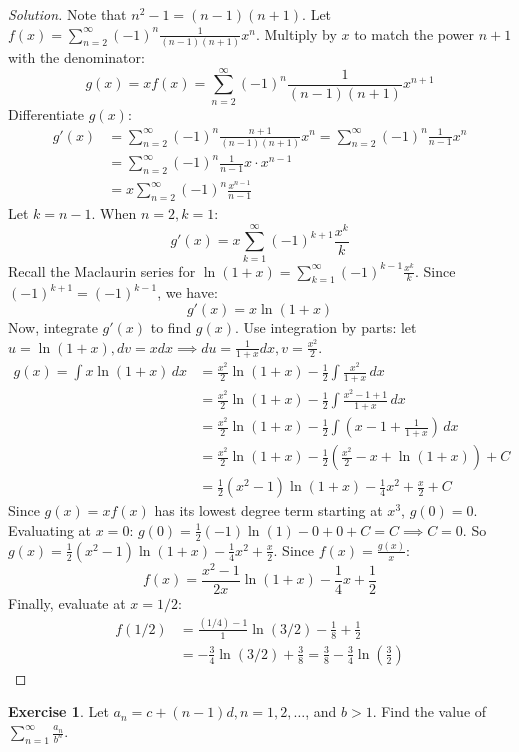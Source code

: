 \documentclass[11pt]{article}
\theoremstyle{definition}
\newtheorem{exercise}{Exercise}[section]
\newenvironment{solution}{\begin{proof}[Solution]}{\end{proof}}
\begin{document}
\begin{solution}
Note that $n^2 - 1 = (n-1)(n+1)$.
Let $f(x) = \sum_{n=2}^{\infty} (-1)^n \frac{1}{(n-1)(n+1)} x^n$.
Multiply by $x$ to match the power $n+1$ with the denominator:
\[
g(x) = xf(x) = \sum_{n=2}^{\infty} (-1)^n \frac{1}{(n-1)(n+1)} x^{n+1}
\]
Differentiate $g(x)$:
\begin{align*}
g'(x) &= \sum_{n=2}^{\infty} (-1)^n \frac{n+1}{(n-1)(n+1)} x^n = \sum_{n=2}^{\infty} (-1)^n \frac{1}{n-1} x^n \\
&= \sum_{n=2}^{\infty} (-1)^n \frac{1}{n-1} x \cdot x^{n-1} \\
&= x \sum_{n=2}^{\infty} (-1)^n \frac{x^{n-1}}{n-1}
\end{align*}
Let $k = n-1$. When $n=2, k=1$:
\[
g'(x) = x \sum_{k=1}^{\infty} (-1)^{k+1} \frac{x^k}{k}
\]
Recall the Maclaurin series for $\ln(1+x) = \sum_{k=1}^{\infty} (-1)^{k-1} \frac{x^k}{k}$. Since $(-1)^{k+1} = (-1)^{k-1}$, we have:
\[
g'(x) = x \ln(1+x)
\]
Now, integrate $g'(x)$ to find $g(x)$. Use integration by parts: let $u = \ln(1+x), dv = x dx \implies du = \frac{1}{1+x}dx, v = \frac{x^2}{2}$.
\begin{align*}
g(x) = \int x \ln(1+x) \,dx &= \frac{x^2}{2}\ln(1+x) - \frac{1}{2} \int \frac{x^2}{1+x} \,dx \\
&= \frac{x^2}{2}\ln(1+x) - \frac{1}{2} \int \frac{x^2 - 1 + 1}{1+x} \,dx \\
&= \frac{x^2}{2}\ln(1+x) - \frac{1}{2} \int \left( x - 1 + \frac{1}{1+x} \right) \,dx \\
&= \frac{x^2}{2}\ln(1+x) - \frac{1}{2} \left( \frac{x^2}{2} - x + \ln(1+x) \right) + C \\
&= \frac{1}{2}(x^2 - 1)\ln(1+x) - \frac{1}{4}x^2 + \frac{x}{2} + C
\end{align*}
Since $g(x) = xf(x)$ has its lowest degree term starting at $x^3$, $g(0) = 0$.
Evaluating at $x=0$: $g(0) = \frac{1}{2}(-1)\ln(1) - 0 + 0 + C = C \implies C = 0$.
So $g(x) = \frac{1}{2}(x^2 - 1)\ln(1+x) - \frac{1}{4}x^2 + \frac{x}{2}$.
Since $f(x) = \frac{g(x)}{x}$:
\[
f(x) = \frac{x^2 - 1}{2x}\ln(1+x) - \frac{1}{4}x + \frac{1}{2}
\]
Finally, evaluate at $x = 1/2$:
\begin{align*}
f(1/2) &= \frac{(1/4) - 1}{1} \ln(3/2) - \frac{1}{8} + \frac{1}{2} \\
&= -\frac{3}{4} \ln(3/2) + \frac{3}{8} = \frac{3}{8} - \frac{3}{4} \ln\left(\frac{3}{2}\right)
\end{align*}
\end{solution}

\begin{exercise}
Let $a_n=c+(n-1)d, n=1,2,\dots$, and $b>1$. Find the value of $\displaystyle \sum_{n=1}^{\infty}\frac{a_n}{b^n}.$
\end{exercise}
\end{document}
